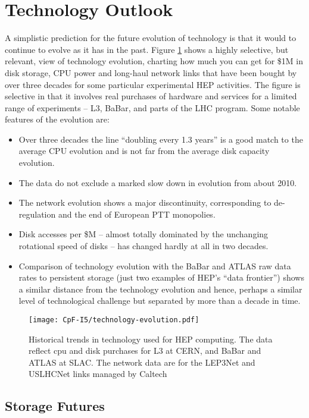 \section{Technology Outlook}
\label{sec:cpfi5-technology}
A simplistic prediction for the future evolution of technology is that it 
would to continue to 
evolve as it has in the past.  Figure \ref{fig:technology-evolution} shows a highly selective, but relevant, 
view of technology evolution, charting how much you can get for \$1M in disk storage, 
CPU power and long-haul network links that have been bought by over three decades 
for some particular experimental HEP activities.  The figure is  selective in that 
it involves real purchases of hardware and services for a limited range of 
experiments -- L3, BaBar, and parts of the LHC program. Some notable features of the 
evolution are:
\begin{itemize}
\item
Over three decades the line ``doubling every 1.3 years'' is a good match to the average 
CPU evolution and is not far from the average disk capacity evolution.
\item
The data do not exclude a marked slow down in evolution from about 2010.
\item
The network evolution shows a major discontinuity, corresponding to de-regulation 
and the end of European PTT monopolies.
\item
Disk accesses per \$M -- almost totally dominated by the unchanging rotational 
speed of disks -- has changed hardly at all in two decades.
\item
Comparison of technology evolution with the BaBar and ATLAS raw data rates to 
persistent storage (just two examples of HEP's ``data frontier'') shows a similar 
distance from the technology evolution and hence, perhaps a similar level of 
technological challenge but separated by more than a decade in time. 
\end{itemize}

\begin{figure}[h]
\centering
\texttt{[image: CpF-I5/technology-evolution.pdf]}
\caption{Historical trends in technology used for HEP computing.  The data reflect cpu and disk purchases for L3 at CERN, and BaBar and ATLAS at SLAC.  The network data are for the LEP3Net and USLHCNet links managed by Caltech}
\label{fig:technology-evolution}
\end{figure}


\subsection{Storage Futures}
